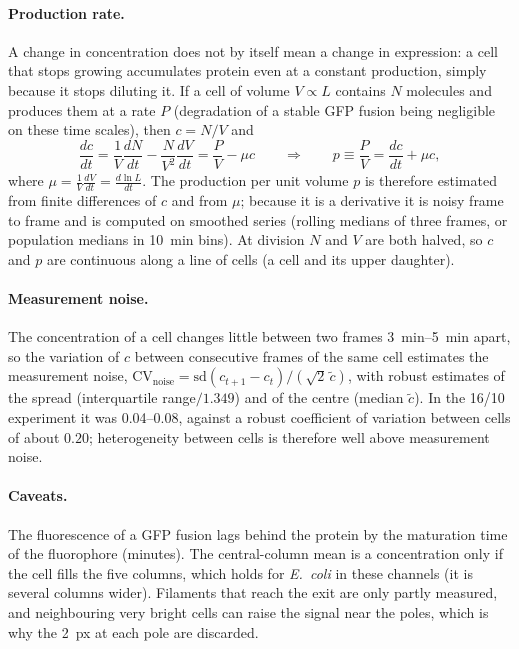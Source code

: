 \documentclass[11pt,a4paper]{article}
\begin{document}
\paragraph{Production rate.} A change in concentration does not by itself mean a change in expression: a cell that stops growing accumulates protein even at a constant production, simply because it stops diluting it. If a cell of volume $V\propto L$ contains $N$ molecules and produces them at a rate $P$ (degradation of a stable GFP fusion being negligible on these time scales), then $c=N/V$ and
\begin{equation}
\frac{dc}{dt}=\frac{1}{V}\frac{dN}{dt}-\frac{N}{V^{2}}\frac{dV}{dt}=\frac{P}{V}-\mu c
\qquad\Longrightarrow\qquad
p\equiv\frac{P}{V}=\frac{dc}{dt}+\mu c ,
\end{equation}
where $\mu=\frac{1}{V}\frac{dV}{dt}=\frac{d\ln L}{dt}$. The production per unit volume $p$ is therefore estimated from finite differences of $c$ and from $\mu$; because it is a derivative it is noisy frame to frame and is computed on smoothed series (rolling medians of three frames, or population medians in \SI{10}{\minute} bins). At division $N$ and $V$ are both halved, so $c$ and $p$ are continuous along a line of cells (a cell and its upper daughter).

\paragraph{Measurement noise.} The concentration of a cell changes little between two frames \SIrange{3}{5}{\minute} apart, so the variation of $c$ between consecutive frames of the same cell estimates the measurement noise, $\mathrm{CV}_{\text{noise}}=\mathrm{sd}(c_{t+1}-c_t)/(\sqrt2\,\tilde c)$, with robust estimates of the spread (interquartile range$/1.349$) and of the centre (median $\tilde c$). In the 16/10 experiment it was \numrange{0.04}{0.08}, against a robust coefficient of variation between cells of about $0.20$; heterogeneity between cells is therefore well above measurement noise.

\paragraph{Caveats.} The fluorescence of a GFP fusion lags behind the protein by the maturation time of the fluorophore (minutes). The central-column mean is a concentration only if the cell fills the five columns, which holds for \emph{E.~coli} in these channels (it is several columns wider). Filaments that reach the exit are only partly measured, and neighbouring very bright cells can raise the signal near the poles, which is why the \SI{2}{px} at each pole are discarded.
\end{document}
